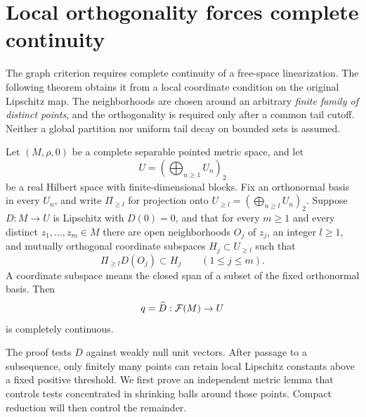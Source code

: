 \section{Local orthogonality forces complete continuity}
\label{sec:localization}

The graph criterion requires complete continuity of a free-space
linearization. The following theorem obtains it from a local
coordinate condition on the original Lipschitz map. The neighborhoods
are chosen around an arbitrary \emph{finite family of distinct
points}, and the orthogonality is required only after a common tail
cutoff. Neither a global partition nor uniform tail decay on bounded
sets is assumed.

\begin{theorem}
\label{thm:localized-linearization}
Let \((M,\rho,0)\) be a complete separable pointed metric space, and
let
\[
 U=\left(\bigoplus_{n\ge1}U_n\right)_2
\]
be a real Hilbert space with finite-dimensional blocks. Fix an
orthonormal basis in every \(U_n\), and write \(\Pi_{\ge l}\) for
projection onto \(U_{\ge l}=(\bigoplus_{n\ge l}U_n)_2\).
Suppose \(D:M\to U\) is Lipschitz with \(D(0)=0\), and that for
every \(m\ge1\) and every distinct \(z_1,\ldots,z_m\in M\) there are
open neighborhoods \(O_j\) of \(z_j\), an integer \(l\ge1\), and
mutually orthogonal coordinate subspaces \(H_j\subset U_{\ge l}\)
such that
\begin{equation}
\label{eq:local-orthogonality}
 \Pi_{\ge l}D(O_j)\subset H_j\qquad(1\le j\le m).
\end{equation}
A coordinate subspace means the closed span of a subset of the fixed
orthonormal basis. Then
\[
 q=\widehat D:\mathcal F(M)\to U
\]
is completely continuous.
\end{theorem}

The proof tests $D$ against weakly null unit vectors. After passage to
a subsequence, only finitely many points can retain local Lipschitz
constants above a fixed positive threshold. We first prove an
independent metric lemma that controls tests concentrated in shrinking
balls around those points. Compact reduction will then control the
remainder.


